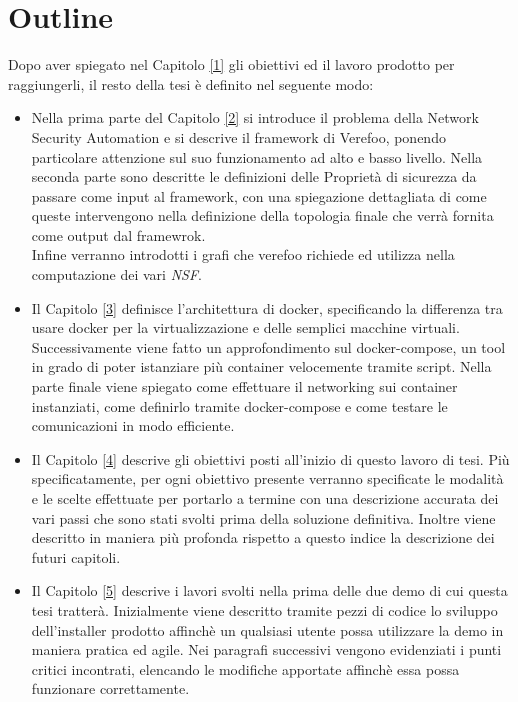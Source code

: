 \section{Outline}

Dopo aver spiegato nel Capitolo \hyperref[ch:intro]{[1]} gli obiettivi ed il lavoro prodotto per raggiungerli, il resto della
tesi è definito nel seguente modo:

\begin{itemize}
    \item Nella prima parte del Capitolo \hyperref[ch:verefoo]{[2]} si introduce il problema della Network Security Automation e si descrive il framework di Verefoo, ponendo particolare attenzione sul suo funzionamento ad alto e basso livello.
        Nella seconda parte sono descritte  le  definizioni delle Proprietà di sicurezza da passare come input al framework, con una spiegazione dettagliata
        di come queste intervengono nella definizione della topologia finale che verrà fornita come output dal framewrok. \\
        Infine verranno introdotti i grafi che verefoo richiede ed utilizza nella computazione dei vari \textit{NSF}.
    \item Il Capitolo \hyperref[ch:docker]{[3]} definisce l'architettura di docker, specificando la differenza tra usare docker per la virtualizzazione e delle semplici macchine virtuali. Successivamente
          viene fatto un approfondimento sul docker-compose, un tool in grado di poter istanziare più container velocemente tramite script. Nella parte finale viene spiegato come effettuare il networking
          sui container instanziati, come definirlo tramite docker-compose e come testare le comunicazioni in modo efficiente.
    \item Il Capitolo \hyperref[ch:ThesisObj]{[4]} descrive gli obiettivi posti all'inizio di questo lavoro di tesi. Più specificatamente, per ogni obiettivo presente verranno specificate le modalità e le scelte effettuate per portarlo a termine con una descrizione accurata dei vari passi che sono stati svolti prima della soluzione definitiva.
          Inoltre viene descritto in maniera più profonda rispetto a questo indice la descrizione dei futuri capitoli.
    \item Il Capitolo \hyperref[ch:ThesisObj]{[5]} descrive i lavori svolti nella prima delle due demo di cui questa tesi tratterà. Inizialmente viene descritto tramite pezzi di codice lo sviluppo dell'installer prodotto affinchè un qualsiasi utente possa
          utilizzare la demo in maniera pratica ed agile. Nei paragrafi successivi vengono evidenziati i punti critici incontrati, elencando le modifiche apportate affinchè essa possa funzionare correttamente.

\end{itemize}
